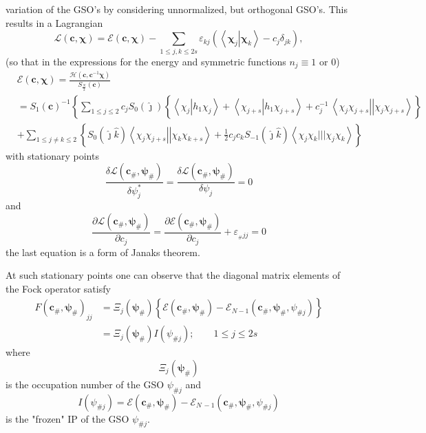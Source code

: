 \documentclass[aps,preprint]{revtex4}%
\begin{document}
variation of the GSO's by considering unnormalized, but orthogonal GSO's. This
results in a Lagrangian
\[
\mathcal{L}\left(  \mathbf{c,\chi}\right)  =\mathcal{E}\left(  \mathbf{c,\chi
}\right)  -\sum_{1\leq j,k\leq2s}\varepsilon_{kj}\left(  \left\langle \left.
\mathbf{\chi}_{j}\right\vert \mathbf{\chi}_{k}\right\rangle -c_{j}\delta
_{jk}\right)  ,
\]
(so that in the expressions for the energy and symmetric functions
$n_{j}\equiv1$ or $0$)%
\begin{align*}
&  \mathcal{E}\left(  \mathbf{c,\chi}\right)  =\frac{\mathcal{H}\left(
\mathbf{c,c}^{-1}\mathbf{\chi}\right)  }{S_{\frac{N}{2}}\left(  \mathbf{c}%
\right)  }\\
&  =S_{1}\left(  \mathbf{c}\right)  ^{-1}\left\{  \sum_{1\leq j\leq2}%
c_{j}S_{0}\left(  \hat{\jmath}\right)  \left\{  \overset{}{\left\langle
\chi_{j}\left\vert h_{1}\chi_{j}\right.  \right\rangle +\left\langle
\chi_{j+s}\left\vert h_{1}\chi_{j+s}\right.  \right\rangle }+c_{j}%
^{-1}\,\left\langle \chi_{j}\chi_{j+s}\right\vert \left\vert \chi_{j}%
\chi_{j+s}\right\rangle \right\}  \right. \\
&  +\sum_{1\leq j\neq k\leq2}\left\{  S_{0}\left(  \hat{\jmath}\hat{k}\right)
\left\langle \chi_{j}\chi_{j+s}\right\vert \left\vert \chi_{k}\chi
_{k+s}\right\rangle +\frac{1}{2}\overset{}{c_{j}c_{k}S_{-1}\left(  \hat
{\jmath}\hat{k}\right)  \left\langle \chi_{j}\chi_{k}|||\chi_{j}\chi
_{k}\right\rangle }\right\}
\end{align*}
with stationary points
\[
\frac{\delta\mathcal{L}\left(  \mathbf{c}_{\#}\mathbf{,\psi}_{\#}\right)
}{\delta\psi_{j}^{\ast}}=\frac{\delta\mathcal{L}\left(  \mathbf{c}%
_{\#}\mathbf{,\psi}_{\#}\right)  }{\delta\psi_{j}}=0
\]
and%
\[
\frac{\partial\mathcal{L}\left(  \mathbf{c}_{\#}\mathbf{,\psi}_{\#}\right)
}{\partial c_{j}}=\frac{\partial\mathcal{E}\left(  \mathbf{c}_{\#}%
\mathbf{,\psi}_{\#}\right)  }{\partial c_{j}}+\varepsilon_{_{\#}jj}=0
\]
the last equation is a form of Janaks theorem.

At such stationary points one can observe that the diagonal matrix elements of
the Fock operator satisfy
\begin{align*}
F\left(  \mathbf{c}_{\#},\mathbf{\psi}_{\#}\right)  _{jj}  &  =\Xi_{j}\left(
\mathbf{\psi}_{\#}\right)  \left\{  \mathcal{E}\left(  \mathbf{c}%
_{\#},\mathbf{\psi}_{\#}\right)  -\mathcal{E}_{N-1}\left(  \mathbf{c}%
_{\#},\mathbf{\psi}_{\#}\mathbf{,}\psi_{\#j}\right)  \right\} \\
&  =\Xi_{j}\left(  \mathbf{\psi}_{\#}\right)  I\left(  \psi_{\#j}\right)
;\qquad1\leq j\leq2s
\end{align*}
where%
\[
\Xi_{j}\left(  \mathbf{\psi}_{\#}\right)
\]
is the occupation number of the GSO $\psi_{\#j}$ and
\[
I\left(  \psi_{\#j}\right)  =\mathcal{E}\left(  \mathbf{c}_{\#},\mathbf{\psi
}_{\#}\right)  -\mathcal{E}_{N\,-1}\left(  \mathbf{c}_{\#},\mathbf{\psi}%
_{\#}\mathbf{,}\psi_{\#j}\right)
\]
is the "frozen" IP of the GSO $\psi_{\#j}.$
\end{document}
